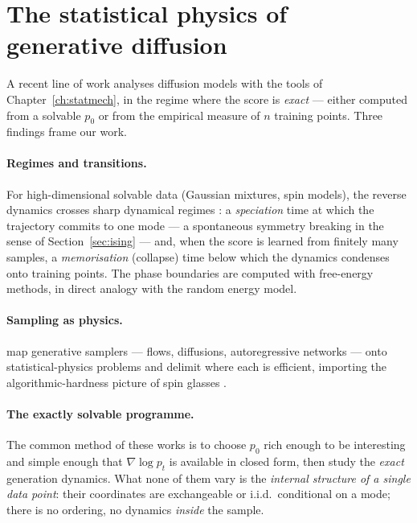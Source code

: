 \section{The statistical physics of generative diffusion}
\label{sec:statphys-diffusion}

A recent line of work analyses diffusion models with the tools of
Chapter~\ref{ch:statmech}, in the regime where the score is \emph{exact} ---
either computed from a solvable $p_0$ or from the empirical measure of $n$
training points. Three findings frame our work.

\paragraph{Regimes and transitions.} For high-dimensional solvable data
(Gaussian mixtures, spin models), the reverse dynamics crosses sharp
dynamical regimes \citep{biroli2023generative, biroli2024dynamical}: a
\emph{speciation} time at which the trajectory commits to one mode ---
a spontaneous symmetry breaking in the sense of Section~\ref{sec:ising}
\citep[see also][]{raya2023spontaneous} --- and, when the score is learned
from finitely many samples, a \emph{memorisation} (collapse) time below
which the dynamics condenses onto training points. The phase boundaries are
computed with free-energy methods, in direct analogy with the random energy
model.

\paragraph{Sampling as physics.} \citet{ghio2024sampling} map generative
samplers --- flows, diffusions, autoregressive networks --- onto
statistical-physics problems and delimit where each is efficient, importing
the algorithmic-hardness picture of spin glasses
\citep{zdeborova2016statistical}.

\paragraph{The exactly solvable programme.} The common method of these
works is to choose $p_0$ rich enough to be interesting and simple enough
that $\nabla \log p_t$ is available in closed form, then study the
\emph{exact} generation dynamics. What none of them vary is the
\emph{internal structure of a single data point}: their coordinates are
exchangeable or i.i.d.\ conditional on a mode; there is no ordering, no
dynamics \emph{inside} the sample.

